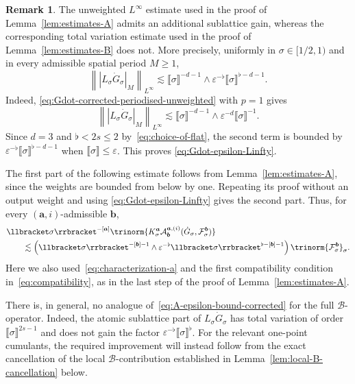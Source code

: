 \documentclass{article}
\numberwithin{equation}{section}
\theoremstyle{plain}
\theoremstyle{definition}
\newtheorem{remark}[theorem]{Remark}
\begin{document}
\begin{remark}
  \label{rem:A-B-epsilon-bounds}
  The unweighted $L^\infty$ estimate used in the proof of
  Lemma~\ref{lem:estimates-A} admits an additional sublattice gain, whereas
  the corresponding total variation estimate used in the proof of
  Lemma~\ref{lem:estimates-B} does not. More precisely, uniformly in
  $\sigma\in[1/2,1)$ and in every admissible spatial period $M\geqslant1$,
  \begin{equation}
    \left\|\left|L_\sigma\dot G_\sigma\right|_M\right\|_{L^\infty}
    \lesssim
    \llbracket\sigma\rrbracket^{-d-1}
    \wedge
    \varepsilon^{-\flat}
    \llbracket\sigma\rrbracket^{\flat-d-1}.
    \label{eq:Gdot-epsilon-Linfty}
  \end{equation}
  Indeed, \eqref{eq:Gdot-corrected-periodised-unweighted} with \(p=1\)
  gives
  \[
    \left\|\left|L_\sigma\dot G_\sigma\right|_M\right\|_{L^\infty}
    \lesssim
    \llbracket\sigma\rrbracket^{-d-1}
    \wedge
    \varepsilon^{-d}\llbracket\sigma\rrbracket^{-1}.
  \]
  Since $d=3$ and $\flat<2s\leqslant2$ by~\eqref{eq:choice-of-flat}, the second
  term is bounded by
  $\varepsilon^{-\flat}\llbracket\sigma\rrbracket^{\flat-d-1}$ when
  $\llbracket\sigma\rrbracket\leqslant\varepsilon$. This proves
  \eqref{eq:Gdot-epsilon-Linfty}.

  The first part of the following estimate follows from
  Lemma~\ref{lem:estimates-A}, since the weights are bounded from below by
  one. Repeating its proof without an output weight and using
  \eqref{eq:Gdot-epsilon-Linfty} gives the second part. Thus, for every
  $(\boldsymbol a,i)$-admissible $\boldsymbol b$,
  \begin{equation}
    \begin{aligned}
      &\llbracket\sigma\rrbracket^{-[\boldsymbol a]}
      \trinorm{
        K^{\boldsymbol a}_\sigma
        \mathcal A^{\boldsymbol a,(i)}_{\boldsymbol b}
        (\dot G_\sigma,\mathcal F^{\boldsymbol b}_\sigma)
      }
      \\
      &\qquad\lesssim
      \left(
        \llbracket\sigma\rrbracket^{-[\boldsymbol b]-1}
        \wedge
        \varepsilon^{-\flat}
        \llbracket\sigma\rrbracket^{\flat-[\boldsymbol b]-1}
      \right)
      \trinorm{\mathcal F^{\boldsymbol b}_\sigma}_\sigma.
    \end{aligned}
    \label{eq:A-epsilon-bound-corrected}
  \end{equation}
  Here we also used~\eqref{eq:characterization-a} and the first compatibility
  condition in~\eqref{eq:compatibility}, as in the last step of the
  proof of Lemma~\ref{lem:estimates-A}.

  There is, in general, no analogue of~\eqref{eq:A-epsilon-bound-corrected}
  for the full $\mathcal B$-operator. Indeed, the atomic sublattice part of
  $L_\sigma\dot G_\sigma$ has total variation of order
  $\llbracket\sigma\rrbracket^{2s-1}$ and does not gain the factor
  $\varepsilon^{-\flat}\llbracket\sigma\rrbracket^\flat$. For the relevant
  one-point cumulants, the required improvement will instead follow from the
  exact cancellation of the local $\mathcal B$-contribution established in
  Lemma~\ref{lem:local-B-cancellation} below.
\end{remark}
\end{document}

